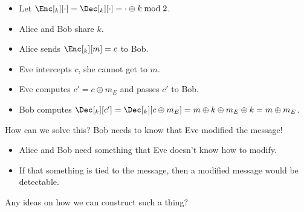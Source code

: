 \begin{frame}
  \begin{example}
    \begin{itemize}
      \item Let \(\Enc[_k][\cdot] = \Dec[_k][\cdot] = \cdot\oplus k\bmod 2\).
        
        \pause{}

      \item Alice and Bob share \(k\).
      \item Alice sends \(\Enc[_k][m] = c\) to Bob.

        \pause{}

      \item Eve intercepts \(c\), she cannot get to \(m\).

        \pause{}

      \item Eve computes \(c' = c\oplus m_E\) and passes \(c'\) to Bob.

        \pause{}

      \item Bob computes \(\Dec[_k][c'] = \Dec[_k][c\oplus m_E] = m\oplus 
        k\oplus m_E\oplus k = m\oplus m_E\).
    \end{itemize}
  \end{example}

  \pause{}
  
  \begin{exercise}
    How can we solve this?
    Bob needs to know that Eve modified the message!
  \end{exercise}
\end{frame}

\begin{frame}
  \begin{idea}
    \begin{itemize}
      \item Alice and Bob need something that Eve doesn't know how to modify.

        \pause{}

      \item If that something is tied to the message, then a modified message 
        would be detectable.
    \end{itemize}
  \end{idea}

  \pause{}

  \begin{exercise}
    Any ideas on how we can construct such a thing?
  \end{exercise}
\end{frame}


